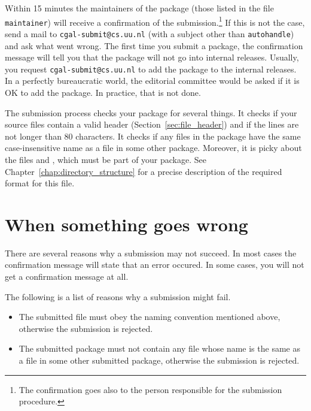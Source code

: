 {Within 15 minutes the maintainers of the package (those listed in the file
\texttt{maintainer}) will receive a confirmation of the
submission.\footnote{The confirmation goes also to the person responsible
for the submission procedure.}  If this is not the case, send a mail to
\texttt{cgal-submit@cs.uu.nl} (with a subject other than \texttt{autohandle}) 
and ask what went
wrong.  The first time you submit a package, the confirmation message will
tell you that the package will not go into internal releases. Usually, you
request \texttt{cgal-submit@cs.uu.nl} to add the package to the internal 
releases. In a perfectly bureaucratic world, the editorial committee would be 
asked if it is OK to add the package. In practice, that is not done.

The submission process checks your package for several things.  It checks
if your source files contain a valid header (Section~\ref{sec:file_header})
and if the lines are not longer than 80 characters. It checks if any files
in the package have the same case-insensitive name as a file in some other
package.  Moreover, it is picky about the files
 and ,
which must be part of your package. See Chapter~\ref{chap:directory_structure}
for a precise description of the required format for this file.


\section{When something goes wrong}
\label{sec:submission_problems}

There are several reasons why a submission may not succeed.
In most cases the confirmation message will state that an error occured. In
some cases, you will not get a confirmation message at all.

The following is a list of reasons why a submission might fail.
\begin{itemize}

\item The submitted file must obey the naming convention mentioned above, 
      otherwise the submission is rejected. 

\item The submitted package must not contain any file whose name is the same
      as a file in some other submitted package, otherwise the submission is 
      rejected. 


\end{itemize}}
